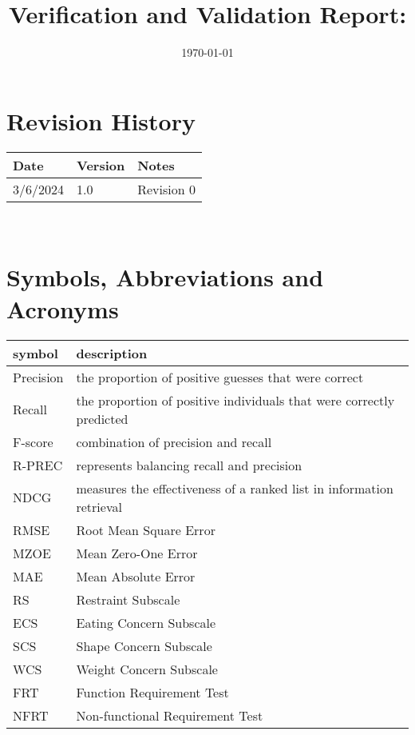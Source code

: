 \documentclass[12pt, titlepage]{article}
\begin{document}
\title{Verification and Validation Report: \progname}
\author{\authname}
\date{\today}
 \maketitle




\section{Revision History}


\begin{tabularx}{\textwidth}{p{3cm}p{2cm}X}
\toprule {\bf Date} & {\bf Version} & {\bf Notes}\\
\midrule
3/6/2024 & 1.0 & Revision 0\\
\bottomrule
\end{tabularx}


~\newpage


\section{Symbols, Abbreviations and Acronyms}


\renewcommand{\arraystretch}{1.2}
\begin{tabular}{l l}
 \toprule   
 \textbf{symbol} & \textbf{description}\\
 \midrule
 Precision & the proportion of positive guesses that were correct\\
 Recall & the proportion of positive individuals that were correctly predicted\\
 F-score & combination of precision and recall\\
 R-PREC & represents balancing recall and precision\\
 NDCG & measures the effectiveness of a ranked list in information retrieval\\
 RMSE & Root Mean Square Error\\
 MZOE & Mean Zero-One Error\\
 MAE & Mean Absolute Error\\
 RS & Restraint Subscale\\
 ECS & Eating Concern Subscale\\
 SCS & Shape Concern Subscale\\
 WCS & Weight Concern Subscale\\
 FRT & Function Requirement Test\\
 NFRT & Non-functional Requirement Test\\


 \bottomrule
\end{tabular}\\
\end{document}
